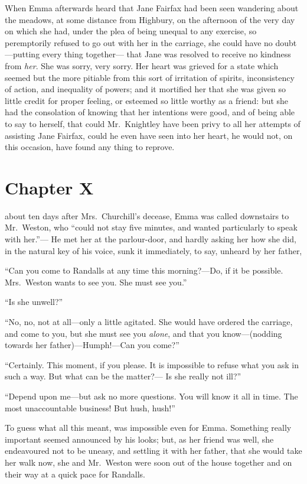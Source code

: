 When Emma afterwards heard that Jane Fairfax had been seen wandering
about the meadows, at some distance from Highbury, on the afternoon
of the very day on which she had, under the plea of being unequal
to any exercise, so peremptorily refused to go out with her in
the carriage, she could have no doubt---putting every thing together---%
that Jane was resolved to receive no kindness from \emph{her}.  She was sorry,
very sorry.  Her heart was grieved for a state which seemed
but the more pitiable from this sort of irritation of spirits,
inconsistency of action, and inequality of powers; and it mortified
her that she was given so little credit for proper feeling, or esteemed
so little worthy as a friend:  but she had the consolation of knowing
that her intentions were good, and of being able to say to herself,
that could Mr.\ Knightley have been privy to all her attempts
of assisting Jane Fairfax, could he even have seen into her heart,
he would not, on this occasion, have found any thing to reprove.



\chapter{Chapter X}


 about ten days after Mrs.\ Churchill's decease,
Emma was called downstairs to Mr.\ Weston, who ``could not stay
five minutes, and wanted particularly to speak with her.''---%
He met her at the parlour-door, and hardly asking her how she did,
in the natural key of his voice, sunk it immediately, to say,
unheard by her father,

``Can you come to Randalls at any time this morning?---Do, if it
be possible.  Mrs.\ Weston wants to see you.  She must see you.''

``Is she unwell?''

``No, no, not at all---only a little agitated.  She would have
ordered the carriage, and come to you, but she must see you \emph{alone},
and that you know---(nodding towards her father)---Humph!---Can you come?''

``Certainly.  This moment, if you please.  It is impossible to
refuse what you ask in such a way.  But what can be the matter?---%
Is she really not ill?''

``Depend upon me---but ask no more questions.  You will know it
all in time.  The most unaccountable business!  But hush, hush!''

To guess what all this meant, was impossible even for Emma.
Something really important seemed announced by his looks;
but, as her friend was well, she endeavoured not to be uneasy,
and settling it with her father, that she would take her walk now,
she and Mr.\ Weston were soon out of the house together and on
their way at a quick pace for Randalls.

